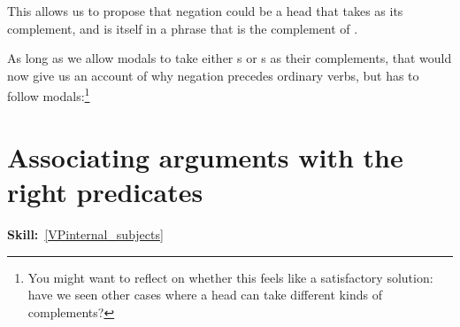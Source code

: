 \documentclass{article}
\begin{document}
This allows us to propose that negation could be a head that takes  as its complement, and is itself in a phrase that is the complement of .
\begin{exe}
\end{exe}
As long as we allow modals to take either s or s as their complements, that would now give us an account of why negation precedes ordinary verbs, but has to follow modals:\footnote{You might want to reflect on whether this feels like a satisfactory solution: have we seen other cases where a head can take different kinds of complements?}
\begin{exe}
\end{exe}

\section{Associating arguments with the right predicates}
\hfill{}\textbf{Skill:}~\ref{VPinternal_subjects}
\end{document}
